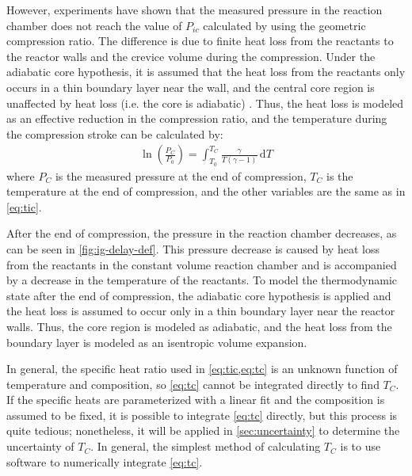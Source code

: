 \documentclass[../main.tex]{subfiles}
\begin{document}
However, experiments have shown that the measured pressure in the reaction chamber
does not reach the value of $P_{ic}$ calculated by using the geometric
compression ratio. The difference is due to finite heat loss from the
reactants to the reactor walls and the crevice volume during the
compression. Under the adiabatic core hypothesis, it is assumed that
the heat loss from the reactants only occurs in a thin boundary layer
near the wall, and the central core region is unaffected by heat loss
(i.e. the core is adiabatic) \cite{Desgroux1995}. Thus, the heat
loss is modeled as an effective reduction in the compression ratio, and
the temperature during the compression stroke can be calculated by:
%
\begin{align}
\ln\left(\frac{P_{C}}{P_0}\right) = \int_{T_0}^{T_{C}} \! \frac{\gamma}{T\left(\gamma-1\right)} \, \mathrm{d} T
\label{eq:tc}
\end{align}
%
where $P_C$ is the measured pressure at the end of compression, $T_C$
is the temperature at the end of compression, and the other variables
are the same as in \cref{eq:tic}.

After the end of compression, the pressure in the reaction chamber
decreases, as can be seen in \cref{fig:ig-delay-def}. This pressure
decrease is caused by heat loss from the reactants in the constant volume reaction
chamber and is accompanied by a decrease in the temperature of the
reactants. To model the thermodynamic state after the end of compression,
the adiabatic core hypothesis is applied and the heat loss is
assumed to occur only in a thin boundary layer near the reactor walls.
Thus, the core region is modeled as adiabatic, and the heat loss
from the boundary layer is modeled as an isentropic volume
expansion.

In general, the specific heat ratio used in \cref{eq:tic,eq:tc} is an
unknown function of temperature and composition, so \cref{eq:tc}
cannot be integrated directly to find $T_C$. If the specific heats are
parameterized with a linear fit and the composition is assumed to be
fixed, it is possible to integrate \cref{eq:tc} directly, but this
process is quite tedious; nonetheless, it will be applied in
\cref{sec:uncertainty} to determine the uncertainty of $T_C$. In
general, the simplest method of calculating $T_C$ is to use software
to numerically integrate \cref{eq:tc}.
\end{document}
